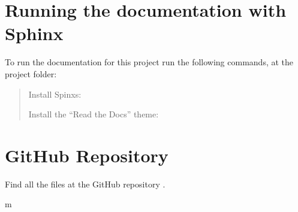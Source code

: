 \documentclass[letterpaper,10pt,english,openany,oneside]{sphinxmanual}
\begin{document}
\section{Running the documentation with Sphinx}
\label{\detokenize{index:running-the-documentation-with-sphinx}}
To run the documentation for this project run the following commands, at the project folder:
\begin{quote}

Install Spinxs:


Install the “Read the Docs” theme:



\end{quote}


\section{GitHub Repository}
\label{\detokenize{index:github-repository}}
Find all the files at the GitHub repository .


\renewcommand{\indexname}{Python Module Index}
\begin{sphinxtheindex}
\def\bigletter#1{{\Large\sffamily#1}\nopagebreak\vspace{1mm}}
\bigletter{m}
\item {}
\item {}
\end{sphinxtheindex}

\renewcommand{\indexname}{Index}
\printindex
\end{document}
